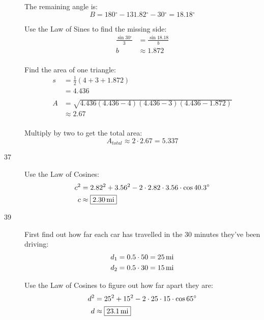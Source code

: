 \documentclass{exam}
\newcommand{\dg}{\ensuremath{^\circ}}
\begin{document}
\begin{description}
        The remaining angle is:
        \[
          B = 180 \dg - 131.82 \dg - 30 \dg = 18.18 \dg
        \]

        Use the Law of Sines to find the missing side:
        \begin{align*}
          \frac{\sin 30 \dg}{3} & = \frac{\sin 18.18}{b} \\
          b                     & \approx 1.872 \\
        \end{align*}

        Find the area of one triangle:
        \begin{align*}
          s  & = \frac{1}{2}(4 + 3 + 1.872) \\
             & = 4.436 \\
          \\
          A  & = \sqrt{4.436 (4.436 - 4)(4.436 - 3) (4.436 - 1.872)} \\
             & \approx 2.67 \\
        \end{align*}

        Multiply by two to get the total area:
        \[
          A_{total} \approx 2 \cdot 2.67 = \boxed{ 5.337 }
        \]

      \item[37]
        Use the Law of Cosines:
        \begin{align*}
          c^2 & = 2.82^2 + 3.56^2 - 2 \cdot 2.82 \cdot 3.56 \cdot \cos 40.3 \dg \\
          c   & \approx \boxed{ \unit[2.30]{mi} } \\
        \end{align*}

      \pagebreak

      \item[39]
        First find out how far each car has travelled in the 30 minutes they've been driving:
        \begin{align*}
          d_1 &= 0.5 \cdot 50 = \unit[25]{mi} \\
          d_2 &= 0.5 \cdot 30 = \unit[15]{mi} \\
        \end{align*}

        Use the Law of Cosines to figure out how far apart they are:
        \begin{align*}
          d^2 & = 25^2 + 15^2 - 2 \cdot 25 \cdot 15 \cdot \cos 65 \dg \\
          d   & \approx \boxed{ \unit[23.1]{mi} } \\
        \end{align*}


\end{description}
\end{document}
